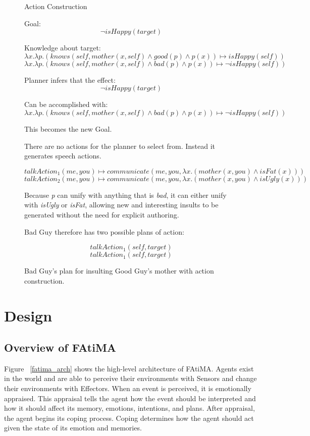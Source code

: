 \documentclass{article}
\begin{document}
\begin{figure}[h!]
  
  \begin{center}\large{Action Construction}\end{center}

  Goal:
  $$
  \neg isHappy(target)
  $$

  Knowledge about target:
  \[
  \lambda x.\lambda p.(knows(self, mother(x,self) \wedge good(p) \wedge p(x)) \mapsto isHappy(self))
  \]
  \[
  \lambda x.\lambda p.(knows(self, mother(x,self) \wedge bad(p) \wedge p(x)) \mapsto \neg isHappy(self))
  \]

  Planner infers that the effect:
  \[
  \neg isHappy(target)
  \]

  Can be accomplished with:
  \[
  \lambda x.\lambda p.(knows(self, mother(x,self) \wedge bad(p) \wedge p(x)) \mapsto \neg isHappy(self))
  \]

  This becomes the new Goal.

  There are no actions for the planner to select from.  Instead it generates speech
  actions.

  \[
  talkAction_1(me, you) \mapsto communicate(me, you, \lambda x.(mother(x, you) \wedge isFat(x)))
  \]
  \[
  talkAction_2(me, you) \mapsto communicate(me, you, \lambda x.(mother(x, you) \wedge isUgly(x)))
  \]

  Because \emph{p} can unify with anything that is \emph{bad}, it can either unify with
  \emph{isUgly} or \emph{isFat}, allowing new and interesting insults to be generated
  without the need for explicit authoring.

  Bad Guy therefore has two possible plans of action:

  \[
  talkAction_1(self, target)
  \]
  \[
  talkAction_1(self, target)
  \]

  \caption{Bad Guy's plan for insulting Good Guy's mother with action construction.}
  \label{plan_construction}
\end{figure}

\section{Design}

\subsection{Overview of FAtiMA}

Figure ~\ref{fatima_arch} shows the high-level architecture of FAtiMA.
Agents exist in the world and are able to perceive their environments
with Sensors and change their environments with Effectors.  When an event
is perceived, it is emotionally appraised.  This appraisal tells the
agent how the event should be interpreted and how it should affect its
memory, emotions, intentions, and plans.  After appraisal, the agent begins
its coping process.  Coping determines how the agent should act given the
state of its emotion and memories.
\end{document}
